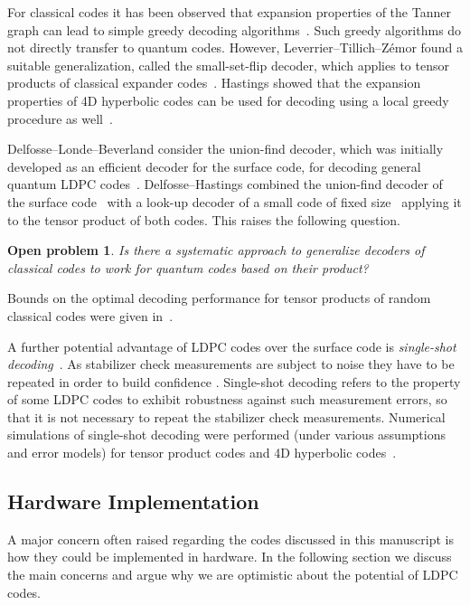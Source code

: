\documentclass[amsmath, amssymb, floatfix, reprint, twocolumn, notitlepage, 10pt]{revtex4-1}
\newcommand{\change}{}
\newtheorem*{oproblem}{Open problem}
\begin{document}
For classical codes it has been observed that expansion properties of the Tanner graph can lead to simple greedy decoding algorithms~\cite{sipser_expander_1996}.
Such greedy algorithms do not directly transfer to quantum codes.
However, Leverrier--Tillich--Z\'emor found a suitable generalization, called the small-set-flip decoder, which applies to tensor products of classical expander codes~\cite{leverrier2015quantum}.
Hastings showed that the expansion properties of 4D hyperbolic codes can be used for decoding using a local greedy procedure as well~\cite{hastings2013decoding}.

{\change
Delfosse--Londe--Beverland consider the union-find decoder, which was initially developed as an efficient decoder for the surface code, for decoding general quantum LDPC codes~\cite{delfosse2021toward}.}
Delfosse--Hastings combined the union-find decoder of the surface code~\cite{delfosse2017almost} with a look-up decoder of a small code of fixed size~\cite{delfosse2020union} applying it to the tensor product of both codes.
This raises the following question.
\begin{oproblem}
Is there a systematic approach to generalize decoders of classical codes to work for quantum codes based on their product?
\end{oproblem}
Bounds on the optimal decoding performance for tensor products of random classical codes were given in~\cite{kovalev2018numerical}.

A further potential advantage of LDPC codes over the surface code is \emph{single-shot decoding}~\cite{bombin2015single}.
As stabilizer check measurements are subject to noise they have to be repeated in order to build confidence \cite{dennis2002topological}.
Single-shot decoding refers to the property of some LDPC codes to exhibit robustness against such measurement errors, so that it is not necessary to repeat the stabilizer check measurements.
{\change
Numerical simulations of single-shot decoding were performed (under various assumptions and error models) for tensor product codes \cite{grospellier2021combining,quintavalle2020single} and 4D hyperbolic codes~\cite{breuckmann2020single}.
}


\subsection{Hardware Implementation}
A major concern often raised regarding the codes discussed in this manuscript is how they could be implemented in hardware. 
In the following section we discuss the main concerns and argue why we are optimistic about the potential of LDPC codes.
\end{document}
